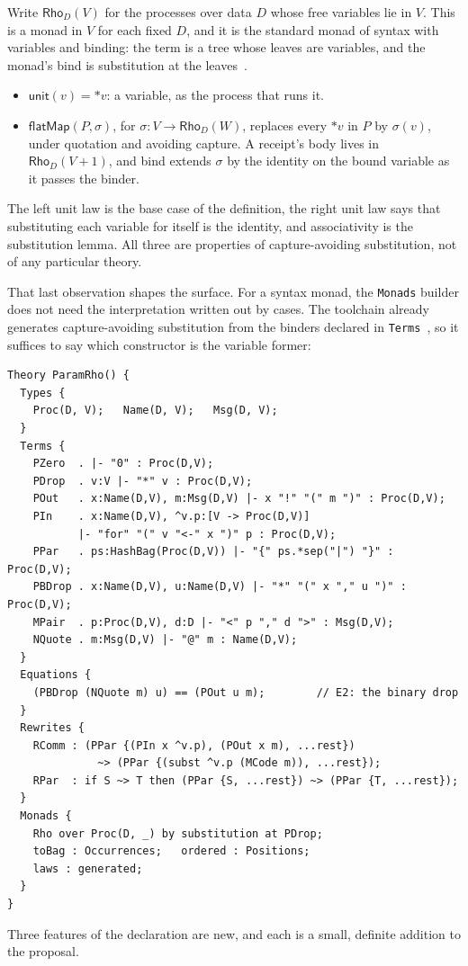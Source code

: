 \documentclass[11pt]{article}
\theoremstyle{definition}
\theoremstyle{plain}
\theoremstyle{remark}
\newcommand{\unit}{\mathsf{unit}}
\newcommand{\bind}{\mathsf{flatMap}}
\begin{document}
Write \(\mathsf{Rho}_D(V)\) for the processes over data \(D\) whose free
variables lie in \(V\). This is a monad in \(V\) for each fixed \(D\), and it is
the standard monad of syntax with variables and binding: the term is a tree
whose leaves are variables, and the monad's bind is substitution at the
leaves~\cite{BirdPaterson99, AltenkirchReus99, FiorePlotkinTuri99}.
\begin{itemize}[nosep]
\item \(\unit(v) = \ast v\): a variable, as the process that runs it.
\item \(\bind(P, \sigma)\), for \(\sigma : V \to \mathsf{Rho}_D(W)\), replaces
every \(\ast v\) in \(P\) by \(\sigma(v)\), under quotation and avoiding
capture. A receipt's body lives in \(\mathsf{Rho}_D(V+1)\), and bind extends
\(\sigma\) by the identity on the bound variable as it passes the binder.
\end{itemize}
The left unit law is the base case of the definition, the right unit law says
that substituting each variable for itself is the identity, and associativity is
the substitution lemma. All three are properties of capture-avoiding
substitution, not of any particular theory.

That last observation shapes the surface. For a syntax monad, the
\texttt{Monads} builder does not need the interpretation written out by cases.
The toolchain already generates capture-avoiding substitution from the binders
declared in \texttt{Terms}~\cite{F1R3Dev}, so it suffices to say which
constructor is the variable former:
\begin{lstlisting}[language=mettail]
Theory ParamRho() {
  Types {
    Proc(D, V);   Name(D, V);   Msg(D, V);
  }
  Terms {
    PZero  . |- "0" : Proc(D,V);
    PDrop  . v:V |- "*" v : Proc(D,V);
    POut   . x:Name(D,V), m:Msg(D,V) |- x "!" "(" m ")" : Proc(D,V);
    PIn    . x:Name(D,V), ^v.p:[V -> Proc(D,V)]
           |- "for" "(" v "<-" x ")" p : Proc(D,V);
    PPar   . ps:HashBag(Proc(D,V)) |- "{" ps.*sep("|") "}" : Proc(D,V);
    PBDrop . x:Name(D,V), u:Name(D,V) |- "*" "(" x "," u ")" : Proc(D,V);
    MPair  . p:Proc(D,V), d:D |- "<" p "," d ">" : Msg(D,V);
    NQuote . m:Msg(D,V) |- "@" m : Name(D,V);
  }
  Equations {
    (PBDrop (NQuote m) u) == (POut u m);        // E2: the binary drop
  }
  Rewrites {
    RComm : (PPar {(PIn x ^v.p), (POut x m), ...rest})
              ~> (PPar {(subst ^v.p (MCode m)), ...rest});
    RPar  : if S ~> T then (PPar {S, ...rest}) ~> (PPar {T, ...rest});
  }
  Monads {
    Rho over Proc(D, _) by substitution at PDrop;
    toBag : Occurrences;   ordered : Positions;
    laws : generated;
  }
}
\end{lstlisting}
Three features of the declaration are new, and each is a small, definite
addition to the proposal.
\end{document}
